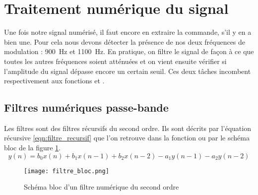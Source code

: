 \section{Traitement numérique du signal}
Une fois notre signal numérisé, il faut encore en extraire la commande, s'il y en a bien une. Pour cela nous devons détecter la présence de nos deux fréquences de modulation : \SI{900}{\hertz} et \SI{1100}{\hertz}. En pratique, on filtre le signal de façon à ce que toutes les autres fréquences soient atténuées et on vient ensuite vérifier si l'amplitude du signal dépasse encore un certain seuil. Ces deux tâches incombent respectivement aux fonctions  et .

\subsection{Filtres numériques passe-bande}
Les filtres sont des filtres récursifs du second ordre. Ils sont décrits par l'équation récursive \ref{eqn:filtre_recursif} que l'on retrouve dans la fonction  ou par le schéma bloc de la figure \ref{fig:filtre_bloc}.
\begin{equation}
y(n) = b_0x(n) + b_1x(n-1) + b_2x(n-2) - a_1y(n-1) - a_2y(n-2)
\label{eqn:filtre_recursif}
\end{equation}
\begin{figure}[htbp]
\centering
\texttt{[image: filtre\_bloc.png]}
\caption{Schéma bloc d'un filtre numérique du second ordre}
\label{fig:filtre_bloc}
\end{figure}

